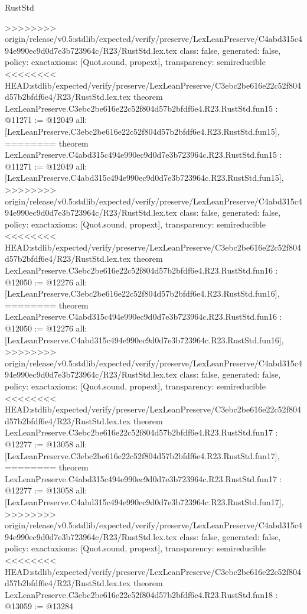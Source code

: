 \begin{lexlean}{RustStd}
\begin{coremodule}
{\begin{coremodule}
{{{{{{{{{{{{{{{{{{>>>>>>>> origin/release/v0.5:stdlib/expected/verify/preserve/LexLeanPreserve/C4abd315c494e990ec9d0d7e3b723964c/R23/RustStd.lex.tex
  class: false,
  generated: false,
  policy: exact{axioms: [Quot.sound, propext]},
  transparency: semireducible
}
<<<<<<<< HEAD:stdlib/expected/verify/preserve/LexLeanPreserve/C3ebc2be616e22c52f804d57b2bfdf6e4/R23/RustStd.lex.tex
theorem LexLeanPreserve.C3ebc2be616e22c52f804d57b2bfdf6e4.R23.RustStd.fun15 : @11271 := @12049 {
  all: [LexLeanPreserve.C3ebc2be616e22c52f804d57b2bfdf6e4.R23.RustStd.fun15],
========
theorem LexLeanPreserve.C4abd315c494e990ec9d0d7e3b723964c.R23.RustStd.fun15 : @11271 := @12049 {
  all: [LexLeanPreserve.C4abd315c494e990ec9d0d7e3b723964c.R23.RustStd.fun15],
>>>>>>>> origin/release/v0.5:stdlib/expected/verify/preserve/LexLeanPreserve/C4abd315c494e990ec9d0d7e3b723964c/R23/RustStd.lex.tex
  class: false,
  generated: false,
  policy: exact{axioms: [Quot.sound, propext]},
  transparency: semireducible
}
<<<<<<<< HEAD:stdlib/expected/verify/preserve/LexLeanPreserve/C3ebc2be616e22c52f804d57b2bfdf6e4/R23/RustStd.lex.tex
theorem LexLeanPreserve.C3ebc2be616e22c52f804d57b2bfdf6e4.R23.RustStd.fun16 : @12050 := @12276 {
  all: [LexLeanPreserve.C3ebc2be616e22c52f804d57b2bfdf6e4.R23.RustStd.fun16],
========
theorem LexLeanPreserve.C4abd315c494e990ec9d0d7e3b723964c.R23.RustStd.fun16 : @12050 := @12276 {
  all: [LexLeanPreserve.C4abd315c494e990ec9d0d7e3b723964c.R23.RustStd.fun16],
>>>>>>>> origin/release/v0.5:stdlib/expected/verify/preserve/LexLeanPreserve/C4abd315c494e990ec9d0d7e3b723964c/R23/RustStd.lex.tex
  class: false,
  generated: false,
  policy: exact{axioms: [Quot.sound, propext]},
  transparency: semireducible
}
<<<<<<<< HEAD:stdlib/expected/verify/preserve/LexLeanPreserve/C3ebc2be616e22c52f804d57b2bfdf6e4/R23/RustStd.lex.tex
theorem LexLeanPreserve.C3ebc2be616e22c52f804d57b2bfdf6e4.R23.RustStd.fun17 : @12277 := @13058 {
  all: [LexLeanPreserve.C3ebc2be616e22c52f804d57b2bfdf6e4.R23.RustStd.fun17],
========
theorem LexLeanPreserve.C4abd315c494e990ec9d0d7e3b723964c.R23.RustStd.fun17 : @12277 := @13058 {
  all: [LexLeanPreserve.C4abd315c494e990ec9d0d7e3b723964c.R23.RustStd.fun17],
>>>>>>>> origin/release/v0.5:stdlib/expected/verify/preserve/LexLeanPreserve/C4abd315c494e990ec9d0d7e3b723964c/R23/RustStd.lex.tex
  class: false,
  generated: false,
  policy: exact{axioms: [Quot.sound, propext]},
  transparency: semireducible
}
<<<<<<<< HEAD:stdlib/expected/verify/preserve/LexLeanPreserve/C3ebc2be616e22c52f804d57b2bfdf6e4/R23/RustStd.lex.tex
theorem LexLeanPreserve.C3ebc2be616e22c52f804d57b2bfdf6e4.R23.RustStd.fun18 : @13059 := @13284 {
}}}}}}}}}}}}}}}}}}}}}
\end{coremodule}}
\end{coremodule}
\end{lexlean}
